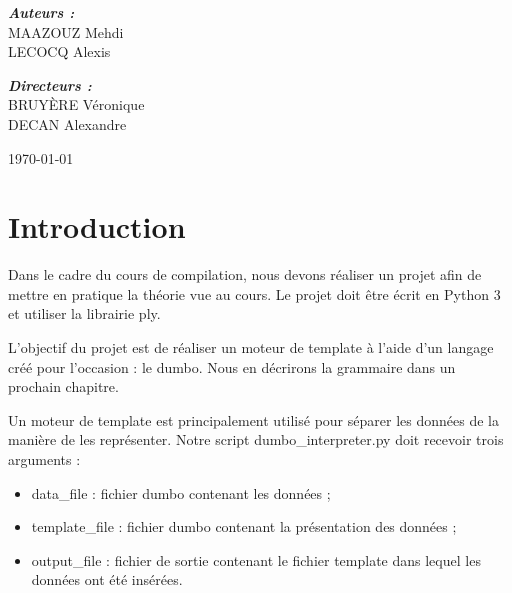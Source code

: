 \documentclass[10pt,a4paper]{article}
\begin{document}
\begin{titlepage}
\begin{sffamily}
\begin{center}
				\begin{minipage}{0.4\textwidth}
					\begin{flushleft} \large
						\emph{\textbf{Auteurs :}}\\
						MAAZOUZ Mehdi\\
						LECOCQ Alexis
					\end{flushleft}
				\end{minipage}
				\begin{minipage}{0.4\textwidth}
					\begin{flushright} \large
						\emph{\textbf{Directeurs :}}\\
						BRUYÈRE Véronique\\
						DECAN Alexandre\\
					\end{flushright}
				\end{minipage}
				
				\vfill
				
				{\large \today}
				
			\end{center}
		\end{sffamily}
	\end{titlepage}
	
	\newpage
	\tableofcontents
	\newpage
	\section{Introduction}
	Dans le cadre du cours de compilation, nous devons réaliser un projet afin de mettre en pratique la théorie vue au cours.
	Le projet doit être écrit en Python 3 et utiliser la librairie ply.
	
	L'objectif du projet est de réaliser un moteur de template à l'aide d'un langage créé pour l'occasion : le dumbo. Nous en décrirons la grammaire dans un prochain chapitre.
	
	Un moteur de template est principalement utilisé pour séparer les données de la manière de les représenter. Notre script dumbo\_interpreter.py doit recevoir trois arguments :
	\begin{itemize}
		\item data\_file : fichier dumbo contenant les données ;
		\item template\_file : fichier dumbo contenant la présentation des données ;
		\item output\_file : fichier de sortie contenant le fichier template dans lequel les données ont été insérées.
	\end{itemize}
	
\end{document}
